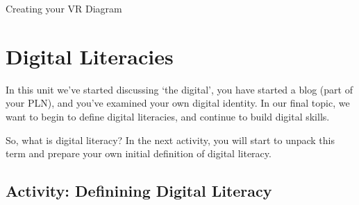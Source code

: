 \documentclass[
]{book}
\theoremstyle{definition}
\theoremstyle{definition}
\theoremstyle{definition}
\theoremstyle{definition}
\theoremstyle{remark}
\begin{document}
\begin{reflect}
{Creating your VR Diagram}
\end{reflect}

\hypertarget{digital-literacies-1}{%
\section{Digital Literacies}\label{digital-literacies-1}}

In this unit we've started discussing `the digital', you have started a blog (part of your PLN), and you've examined your own digital identity. In our final topic, we want to begin to define digital literacies, and continue to build digital skills.

So, what is digital literacy? In the next activity, you will start to unpack this term and prepare your own initial definition of digital literacy.

\hypertarget{activity-definining-digital-literacy}{%
\subsection*{Activity: Definining Digital Literacy}\label{activity-definining-digital-literacy}}
\end{document}
